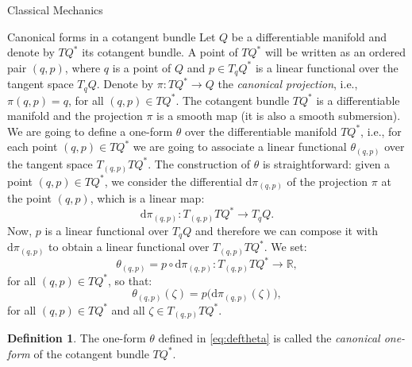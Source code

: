 \documentclass[oneside,a4paper,11pt]{amsbook}
\newcommand{\R}{\mathds R}
\newcommand{\dd}{\mathrm d}
\theoremstyle{remark}\newtheorem{exercise}{Exercise}[chapter]
\theoremstyle{plain}\newtheorem{teo}{Theorem}[section]
\theoremstyle{plain}\newtheorem{lem}[teo]{Lemma}
\theoremstyle{plain}\newtheorem{prop}[teo]{Proposition}
\theoremstyle{plain}\newtheorem{cor}[teo]{Corollary}
\theoremstyle{definition}\newtheorem{defin}[teo]{Definition}
\theoremstyle{remark}\newtheorem{rem}[teo]{Remark}
\theoremstyle{definition}\newtheorem{notation}[teo]{Notation}
\theoremstyle{definition}\newtheorem{convention}[teo]{Convention}
\theoremstyle{definition}\newtheorem{example}[teo]{Example}
\numberwithin{section}{chapter}
\numberwithin{equation}{section}
\begin{document}
\begin{chapter}{Classical Mechanics}
\begin{section}{Canonical forms in a cotangent bundle}
Let $Q$ be a differentiable manifold and denote by $TQ^*$ its cotangent bundle. A point of $TQ^*$ will be written as an ordered pair $(q,p)$, where
$q$ is a point of $Q$ and $p\in T_qQ^*$ is a linear functional over the tangent space $T_qQ$. Denote by $\pi:TQ^*\to Q$ the {\em canonical projection},
i.e., $\pi(q,p)=q$, for all $(q,p)\in TQ^*$.
The cotangent bundle $TQ^*$ is a differentiable manifold and the projection $\pi$ is a smooth map (it is also a smooth submersion).
We are going to define a one-form $\theta$ over the differentiable manifold $TQ^*$, i.e., for each point $(q,p)\in TQ^*$ we are going to associate a linear
functional $\theta_{(q,p)}$ over the tangent space $T_{(q,p)}TQ^*$. The construction of $\theta$ is straightforward: given a point $(q,p)\in TQ^*$, we consider
the differential $\dd\pi_{(q,p)}$ of the projection $\pi$ at the point $(q,p)$, which is a linear map:
\[\dd\pi_{(q,p)}:T_{(q,p)}TQ^*\longrightarrow T_qQ.\]
Now, $p$ is a linear functional over $T_qQ$ and therefore we can compose it with $\dd\pi_{(q,p)}$ to obtain a linear functional over $T_{(q,p)}TQ^*$.
We set:
\begin{equation}\label{eq:deftheta}
\theta_{(q,p)}=p\circ\dd\pi_{(q,p)}:T_{(q,p)}TQ^*\longrightarrow\R,
\end{equation}
for all $(q,p)\in TQ^*$, so that:
\[\theta_{(q,p)}(\zeta)=p\big(\dd\pi_{(q,p)}(\zeta)\big),\]
for all $(q,p)\in TQ^*$ and all $\zeta\in T_{(q,p)}TQ^*$.

\begin{defin}
The one-form $\theta$ defined in \eqref{eq:deftheta} is called the {\em canonical one-form\/} of the cotangent bundle $TQ^*$.
\end{defin}


\end{section}
\end{chapter}
\end{document}
